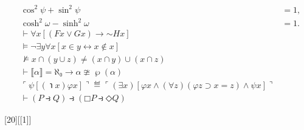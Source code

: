 \documentclass[a4paper,twoside,12pt]{book} %
\begin{document}
\begin{align}
& \cos^2\psi+\sin^2\psi & = 1, \\
& \cosh^2\omega-\sinh^2\omega &=1. \\
& ⊢ ∀x[(Fx ∨ Gx) → \mathord{∼}Hx] \\
& ⊨ ¬∃y∀x[x∈y ↔ x∉x]  \\
& ⊭ x ∩ (y ∪ z) ≠ (x ∩ y) ∪ (x ∩ z) \\
& ⊢ ⟦α⟧ = ℵ₀ → α ≇ ℘(α) \\
& ⌜ψ[(℩x)φx]⌝ ≝
     ⌜(∃x)[φx ∧ (∀z)(φz ⊃ x=z) ∧ ψx]⌝ \\
& ⊢ (P ⥽ Q) ⥽ (□P ⥽ ◇Q)
\end{align}

{[20][[1]]}



\end{document}
